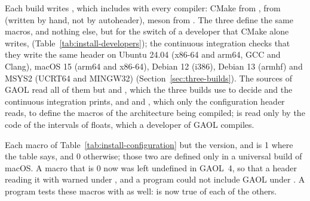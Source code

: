 Each build writes , which
 includes with every compiler: CMake from
,  from
 (written by hand, not by autoheader),
meson from . The three define the
same macros, and nothing else, but for the switch of a developer that CMake
alone writes, 
(Table~\ref{tab:install-developers}); the continuous integration checks that
they write the same header on Ubuntu 24.04 (x86-64 and arm64, GCC and
Clang), macOS 15 (arm64 and x86-64), Debian 12 (i386), Debian 13 (armhf) and
MSYS2 (UCRT64 and MINGW32) (Section~\ref{sec:three-builds}).\newinvfive{} The sources of GAOL read all
of them but  and ,
which the three builds use to decide  and the
continuous integration prints, and  and
, which only the configuration header reads, to
define the macros of the architecture being compiled;
 is read only by the code of the
intervals of floats, which a developer of GAOL compiles.

\begin{Rem}
Each macro of Table~\ref{tab:install-configuration} but the version,
 and  is 1 where the
table says, and 0 otherwise; those two are defined only in a universal build of
macOS.\newinvfive{} A macro that is 0 now was left undefined in
GAOL~4, so that a header reading it with  warned under
, and a program could not include GAOL under
. A program tests these macros with  as
well:  is now true of each of the others.
\end{Rem}

